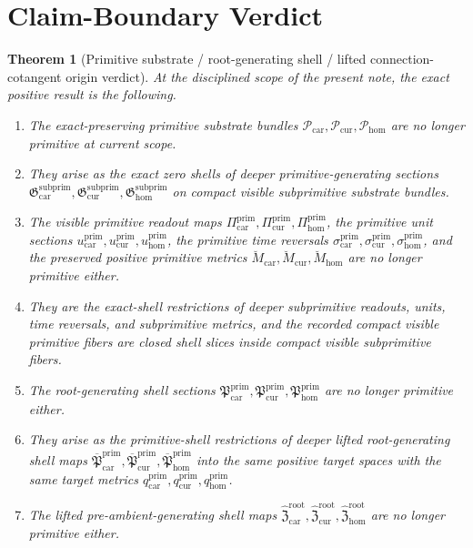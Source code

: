 \documentclass[11pt]{article}
\newcommand{\TensorPrimitiveSpace}{\mathcal P_{\mathrm{car}}}
\newcommand{\CurPrimitiveSpace}{\mathcal P_{\mathrm{cur}}}
\newcommand{\HomPrimitiveSpace}{\mathcal P_{\mathrm{hom}}}
\newcommand{\TensorPrimitiveRead}{\Pi_{\mathrm{car}}^{\mathrm{prim}}}
\newcommand{\CurPrimitiveRead}{\Pi_{\mathrm{cur}}^{\mathrm{prim}}}
\newcommand{\HomPrimitiveRead}{\Pi_{\mathrm{hom}}^{\mathrm{prim}}}
\newcommand{\TensorPrimitiveUnit}{u_{\mathrm{car}}^{\mathrm{prim}}}
\newcommand{\CurPrimitiveUnit}{u_{\mathrm{cur}}^{\mathrm{prim}}}
\newcommand{\HomPrimitiveUnit}{u_{\mathrm{hom}}^{\mathrm{prim}}}
\newcommand{\TensorPrimitiveTimeRev}{\sigma_{\mathrm{car}}^{\mathrm{prim}}}
\newcommand{\CurPrimitiveTimeRev}{\sigma_{\mathrm{cur}}^{\mathrm{prim}}}
\newcommand{\HomPrimitiveTimeRev}{\sigma_{\mathrm{hom}}^{\mathrm{prim}}}
\newcommand{\TensorPrimitiveSpaceMetric}{\breve M_{\mathrm{car}}}
\newcommand{\CurPrimitiveSpaceMetric}{\breve M_{\mathrm{cur}}}
\newcommand{\HomPrimitiveSpaceMetric}{\breve M_{\mathrm{hom}}}
\newcommand{\TensorPrimitiveTargetMetric}{q_{\mathrm{car}}^{\mathrm{prim}}}
\newcommand{\CurPrimitiveTargetMetric}{q_{\mathrm{cur}}^{\mathrm{prim}}}
\newcommand{\HomPrimitiveTargetMetric}{q_{\mathrm{hom}}^{\mathrm{prim}}}
\newcommand{\TensorPrimitiveSection}{\mathfrak P_{\mathrm{car}}^{\mathrm{prim}}}
\newcommand{\CurPrimitiveSection}{\mathfrak P_{\mathrm{cur}}^{\mathrm{prim}}}
\newcommand{\HomPrimitiveSection}{\mathfrak P_{\mathrm{hom}}^{\mathrm{prim}}}
\newcommand{\TensorPrimitiveLiftedPreAmbientSection}{\widehat{\mathfrak Z}_{\mathrm{car}}^{\mathrm{root}}}
\newcommand{\CurPrimitiveLiftedPreAmbientSection}{\widehat{\mathfrak Z}_{\mathrm{cur}}^{\mathrm{root}}}
\newcommand{\HomPrimitiveLiftedPreAmbientSection}{\widehat{\mathfrak Z}_{\mathrm{hom}}^{\mathrm{root}}}
\newcommand{\TensorSubprimitiveSection}{\mathfrak G_{\mathrm{car}}^{\mathrm{subprim}}}
\newcommand{\CurSubprimitiveSection}{\mathfrak G_{\mathrm{cur}}^{\mathrm{subprim}}}
\newcommand{\HomSubprimitiveSection}{\mathfrak G_{\mathrm{hom}}^{\mathrm{subprim}}}
\newcommand{\TensorSubprimitiveLiftedRootSection}{\overline{\mathfrak P}_{\mathrm{car}}^{\mathrm{prim}}}
\newcommand{\CurSubprimitiveLiftedRootSection}{\overline{\mathfrak P}_{\mathrm{cur}}^{\mathrm{prim}}}
\newcommand{\HomSubprimitiveLiftedRootSection}{\overline{\mathfrak P}_{\mathrm{hom}}^{\mathrm{prim}}}
\newtheorem{theorem}{Theorem}
\begin{document}
\section{Claim-Boundary Verdict}

\begin{theorem}[Primitive substrate / root-generating shell / lifted connection-cotangent origin verdict]
\label{thm:verdict}
At the disciplined scope of the present note, the exact positive result is the following.
\begin{enumerate}
    \item The exact-preserving primitive substrate bundles \(\TensorPrimitiveSpace,\CurPrimitiveSpace,\HomPrimitiveSpace\) are no longer primitive at current scope.
    \item They arise as the exact zero shells of deeper primitive-generating sections \(\TensorSubprimitiveSection,\CurSubprimitiveSection,\HomSubprimitiveSection\) on compact visible subprimitive substrate bundles.
    \item The visible primitive readout maps \(\TensorPrimitiveRead,\CurPrimitiveRead,\HomPrimitiveRead\), the primitive unit sections \(\TensorPrimitiveUnit,\CurPrimitiveUnit,\HomPrimitiveUnit\), the primitive time reversals \(\TensorPrimitiveTimeRev,\CurPrimitiveTimeRev,\HomPrimitiveTimeRev\), and the preserved positive primitive metrics \(\TensorPrimitiveSpaceMetric,\CurPrimitiveSpaceMetric,\HomPrimitiveSpaceMetric\) are no longer primitive either.
    \item They are the exact-shell restrictions of deeper subprimitive readouts, units, time reversals, and subprimitive metrics, and the recorded compact visible primitive fibers are closed shell slices inside compact visible subprimitive fibers.
    \item The root-generating shell sections \(\TensorPrimitiveSection,\CurPrimitiveSection,\HomPrimitiveSection\) are no longer primitive either.
    \item They arise as the primitive-shell restrictions of deeper lifted root-generating shell maps \(\TensorSubprimitiveLiftedRootSection,\CurSubprimitiveLiftedRootSection,\HomSubprimitiveLiftedRootSection\) into the same positive target spaces with the same target metrics \(\TensorPrimitiveTargetMetric,\CurPrimitiveTargetMetric,\HomPrimitiveTargetMetric\).
    \item The lifted pre-ambient-generating shell maps \(\TensorPrimitiveLiftedPreAmbientSection,\CurPrimitiveLiftedPreAmbientSection,\HomPrimitiveLiftedPreAmbientSection\) are no longer primitive either.

\end{enumerate}
\end{theorem}
\end{document}
